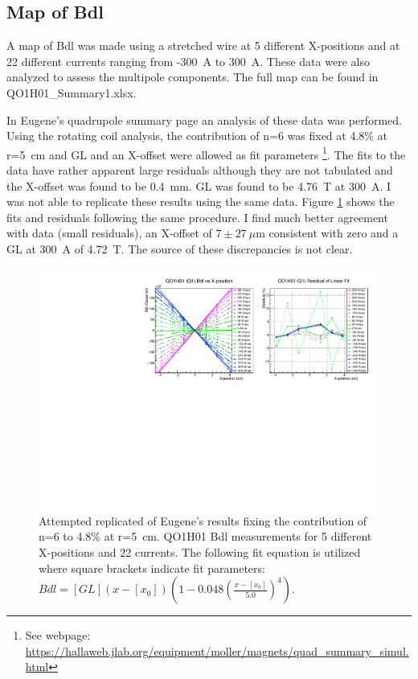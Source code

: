 \documentclass[12pt]{article}
\begin{document}
\subsection{Map of Bdl}
A map of Bdl was made using a stretched wire at 5 different X-positions and at 22 different currents ranging from -300~A to 300~A. These data were also analyzed to assess the multipole components. The full map can be found in QO1H01\_Summary1.xlsx. 

In Eugene's quadrupole summary page an analysis of these data was performed. Using the rotating coil analysis, the contribution of n=6 was fixed at 4.8\% at r=5~cm and GL and an X-offset were allowed as fit parameters \footnote{See webpage: \href{https://hallaweb.jlab.org/equipment/moller/magnets/quad_summary_simul.html}{https://hallaweb.jlab.org/equipment/moller/magnets/quad\_summary\_simul.html}}. The fits to the data have rather apparent large residuals although they are not tabulated and the X-offset was found to be 0.4~mm. GL was found to be 4.76~T at 300~A. I was not able to replicate these results using the same data. Figure \ref{fig:EugeneComp} shows the fits and residuals following the same procedure. I find much better agreement with data (small residuals), an X-offset of $7\pm27~\mu$m consistent with zero and a GL at 300~A of 4.72~T. The source of these discrepancies is not clear.
\begin{figure}[!h]
\centering
\includegraphics[width=1\textwidth]{EugeneCompNewQ1.pdf}
\caption{\label{fig:EugeneComp}Attempted replicated of Eugene's results fixing the contribution of n=6 to 4.8\% at r=5~cm. QO1H01 Bdl measurements for 5 different X-positions and 22 currents. The following fit equation is utilized where square brackets indicate fit parameters: $Bdl=[GL](x-[x_0])\left(1-0.048\left(\frac{x-[x_0]}{5.0}\right)^4\right)$.}
\end{figure}
\end{document}
